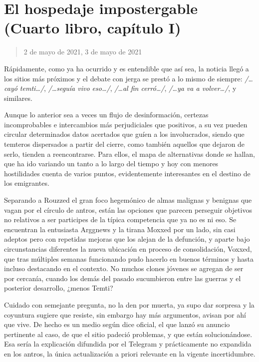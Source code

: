 \documentclass[
]{book}
\begin{document}
\hypertarget{el-hospedaje-impostergable-cuarto-libro-capuxedtulo-i}{%
\section{El hospedaje impostergable (Cuarto libro, capítulo I)}\label{el-hospedaje-impostergable-cuarto-libro-capuxedtulo-i}}

\begin{quote}
2 de mayo de 2021, 3 de mayo de 2021
\end{quote}

Rápidamente, como ya ha ocurrido y es entendible que así sea, la noticia llegó a los sitios más próximos y el debate con jerga se prestó a lo mismo de siempre: \emph{/\ldots cayó temti\ldots/}, \emph{/\ldots seguía vivo eso\ldots/}, \emph{/\ldots al fin cerró\ldots/}, \emph{/\ldots ya va a volver\ldots/}, y similares.

Aunque lo anterior sea a veces un flujo de desinformación, certezas incomprobables e intercambios más perjudiciales que positivos, a su vez pueden circular determinados datos acertados que guíen a los involucrados, siendo que temteros dispersados a partir del cierre, como también aquellos que dejaron de serlo, tienden a reencontrarse. Para ellos, el mapa de alternativas donde se hallan, que ha ido variando un tanto a lo largo del tiempo y hoy con menores hostilidades cuenta de varios puntos, evidentemente interesantes en el destino de los emigrantes.

Separando a Rouzzed el gran foco hegemónico de almas malignas y benignas que vagan por el círculo de antros, están las opciones que parecen perseguir objetivos no relativos a ser participes de la típica competencia que ya no es ni eso. Se encuentran la entusiasta Arggnews y la tirana Moxxed por un lado, sin casi adeptos pero con repetidas mejoras que los alejan de la defunción, y aparte bajo circunstancias diferentes la nueva ubicación en proceso de consolidación, Voxxed, que tras múltiples semanas funcionando pudo hacerlo en buenos términos y hasta incluso destacando en el contexto. No muchos clones jóvenes se agregan de ser por cercanía, cuando los demás del pasado sucumbieron entre las guerras y el posterior desarrollo, ¿menos Temti?

Cuidado con semejante pregunta, no la den por muerta, ya supo dar sorpresa y la coyuntura sugiere que resiste, sin embargo hay más argumentos, avisan por ahí que vive. De hecho es un medio según dice oficial, el que lanzó su anuncio pertinente al caso, de que el sitio padeció problemas, y que están solucionándose. Esa sería la explicación difundida por el Telegram y prácticamente no expandida en los antros, la única actualización a priori relevante en la vigente incertidumbre.
\end{document}
